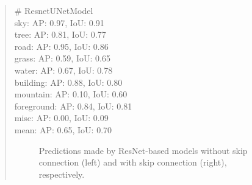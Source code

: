 \documentclass[9pt]{article}
\begin{document}
\begin{quote}
{\# ResnetUNetModel \\
sky: AP: 0.97, IoU: 0.91 \\
tree: AP: 0.81, IoU: 0.77 \\
road: AP: 0.95, IoU: 0.86 \\
grass: AP: 0.59, IoU: 0.65 \\
water: AP: 0.67, IoU: 0.78 \\
building: AP: 0.88, IoU: 0.80 \\
mountain: AP: 0.10, IoU: 0.60 \\
foreground: AP: 0.84, IoU: 0.81 \\
misc: AP: 0.00, IoU: 0.09 \\
mean: AP: 0.65, IoU: 0.70 \\
}

\begin{figure}[h]
    \centering
    \qquad
    \caption{Predictions made by ResNet-based models without skip connection (left) and with skip connection (right), respectively.}
    \label{fig:pred-ResnetBasedModel}
\end{figure}

\end{quote}
\end{document}

